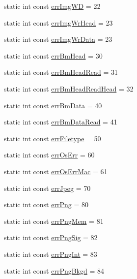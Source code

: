 \begin{DoxyCompactItemize}
static int const \mbox{\hyperlink{classErrorHandler_afe6bbe690173284ff3f3adb889c036d8}{err\+Img\+WD}} = 22
\item 
static int const \mbox{\hyperlink{classErrorHandler_a76194049ce9812eacb553724e5c1d78c}{err\+Img\+Wr\+Head}} = 23
\item 
static int const \mbox{\hyperlink{classErrorHandler_a5f37588aedcbd44ec5b33f16dd35a01e}{err\+Img\+Wr\+Data}} = 23
\item 
static int const \mbox{\hyperlink{classErrorHandler_a9387c79594c780b28b71ec7a6adc5f8c}{err\+Bm\+Head}} = 30
\item 
static int const \mbox{\hyperlink{classErrorHandler_a8d71033ce6652f30c0ca4f0aa045a0dd}{err\+Bm\+Head\+Read}} = 31
\item 
static int const \mbox{\hyperlink{classErrorHandler_a9af29b3a10176d3e75342926bebc51bc}{err\+Bm\+Head\+Read\+Head}} = 32
\item 
static int const \mbox{\hyperlink{classErrorHandler_a0669b576bba1701445fc5e030cc23121}{err\+Bm\+Data}} = 40
\item 
static int const \mbox{\hyperlink{classErrorHandler_aa4d84bd14f132bc85fd7bccd9849b084}{err\+Bm\+Data\+Read}} = 41
\item 
static int const \mbox{\hyperlink{classErrorHandler_ae986729eee88277437cb64561249433d}{err\+Filetype}} = 50
\item 
static int const \mbox{\hyperlink{classErrorHandler_ab216b4dc48424850bdf52da2f4273023}{err\+Os\+Err}} = 60
\item 
static int const \mbox{\hyperlink{classErrorHandler_a8a55f0e95e22d240e37739a851d2fe8d}{err\+Os\+Err\+Mac}} = 61
\item 
static int const \mbox{\hyperlink{classErrorHandler_af7135a739c7124dd8e90330d664f576d}{err\+Jpeg}} = 70
\item 
static int const \mbox{\hyperlink{classErrorHandler_a675f3fcaf9ff86df1e50aae59922f912}{err\+Png}} = 80
\item 
static int const \mbox{\hyperlink{classErrorHandler_a07cc422c69b1e7138800ec16524bd9e4}{err\+Png\+Mem}} = 81
\item 
static int const \mbox{\hyperlink{classErrorHandler_a1b8c14322c54e4789f9d29503f939b5b}{err\+Png\+Sig}} = 82
\item 
static int const \mbox{\hyperlink{classErrorHandler_a6d977525061671cc3f510123163e4ce6}{err\+Png\+Int}} = 83
\item 
static int const \mbox{\hyperlink{classErrorHandler_ab207964238bf9d2c00f623d6a045fa9f}{err\+Png\+Bkgd}} = 84

\end{DoxyCompactItemize}
